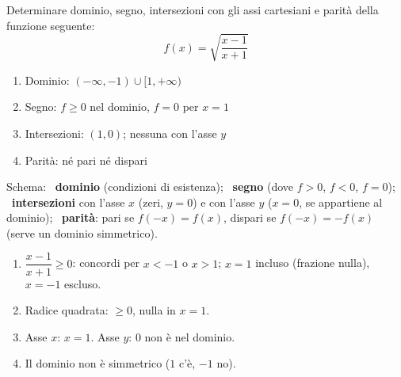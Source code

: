 \begin{question}[ID=1.13, subtitle={Studio di una funzione radicale fratta}, difficulty=difficile, tags={funzioni, studio di funzione, radicali}]
Determinare dominio, segno, intersezioni con gli assi cartesiani e parità della funzione seguente:
\begin{equation*}
    f(x)=\sqrt{\frac{x-1}{x+1}}
\end{equation*}
\begin{solution}
\begin{enumerate}
    \item Dominio: $(-\infty,-1)\cup[1,+\infty)$
    \item Segno: $f\geq0$ nel dominio, $f=0$ per $x=1$
    \item Intersezioni: $(1,0)$; nessuna con l'asse $y$
    \item Parità: né pari né dispari
\end{enumerate}
\end{solution}
\begin{explanation}
Schema: \ \textbf{dominio} (condizioni di esistenza); \ \textbf{segno} (dove $f>0$, $f<0$, $f=0$); \ \textbf{intersezioni} con l'asse $x$ (zeri, $y=0$) e con l'asse $y$ ($x=0$, se appartiene al dominio); \ \textbf{parità}: pari se $f(-x)=f(x)$, dispari se $f(-x)=-f(x)$ (serve un dominio simmetrico).
\begin{enumerate}
    \item $\dfrac{x-1}{x+1}\geq0$: concordi per $x<-1$ o $x>1$; $x=1$ incluso (frazione nulla), $x=-1$ escluso.
    \item Radice quadrata: $\geq0$, nulla in $x=1$.
    \item Asse $x$: $x=1$. Asse $y$: $0$ non è nel dominio.
    \item Il dominio non è simmetrico ($1$ c'è, $-1$ no).
\end{enumerate}
\end{explanation}
\end{question}


